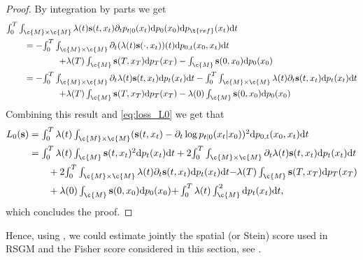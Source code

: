 \begin{proof}
	By integration by parts we get \begin{align} &\textstyle{\int_0^T \int_{\c{M}\times\c{M}} \lambda(t) \mathbf{s}(t, x_t) \partial_t p_{t|0}(x_t)\mathrm{d} p_0(x_0) \mathrm{d} p_{\t{ref}}(x_t) \mathrm{d} t} \\ & \qquad = - \textstyle{\int_0^T \int_{\c{M}\times\c{M}} \partial_t (\lambda(t) \mathbf{s}(\cdot, x_t))(t) \mathrm{d} p_{0,t}(x_0, x_t) \mathrm{d} t}\\ & \qquad \qquad \qquad \textstyle{+ \lambda(T) \int_\c{M} \mathbf{s}(T, x_T) \mathrm{d} p_T(x_T) - \int_\c{M} \mathbf{s}(0, x_0) \mathrm{d} p_0(x_0)} \\ & \qquad = - \textstyle{\int_0^T \int_{\c{M}\times\c{M}} \partial_t \lambda(t) \mathbf{s}(t, x_t) \mathrm{d} p_{t}(x_t) \mathrm{d} t} - \textstyle{\int_0^T \int_{\c{M}\times\c{M}} \lambda(t) \partial_t \mathbf{s}(t, x_t) \mathrm{d} p_{t}(x_t) \mathrm{d} t}\\ & \qquad \qquad \qquad \textstyle{+ \lambda(T) \int_\c{M} \mathbf{s}(T, x_T) \mathrm{d} p_T(x_T) - \lambda(0) \int_\c{M} \mathbf{s}(0, x_0) \mathrm{d} p_0(x_0)} \end{align} Combining this result and \eqref{eq:loss_L0} we get that \begin{align} L_0(\mathbf{s}) &= \textstyle{\int_0^T \lambda(t) \int_{\c{M} \times \c{M}} (\mathbf{s}(t, x_t) - \partial_t \log p_{t|0}(x_t|x_0))^2 \mathrm{d} p_{0,t}(x_0, x_t) \mathrm{d} t} \\ &= \textstyle{\int_0^T \lambda(t) \int_{\c{M}} \mathbf{s}(t, x_t)^2 \mathrm{d} p_t(x_t) \mathrm{d} t} + 2 \textstyle{\int_0^T \int_{\c{M}\times\c{M}} \partial_t \lambda(t) \mathbf{s}(t, x_t) \mathrm{d} p_{t}(x_t) \mathrm{d} t} \\ & \qquad +2 \textstyle{\int_0^T \int_{\c{M}\times\c{M}} \lambda(t) \partial_t \mathbf{s}(t, x_t) \mathrm{d} p_{t}(x_t) \mathrm{d} t} \textstyle{- \lambda(T) \int_\c{M} \mathbf{s}(T, x_T) \mathrm{d} p_T(x_T)} \\ & \qquad + \textstyle{\lambda(0) \int_\c{M} \mathbf{s}(0, x_0) \mathrm{d} p_0(x_0)} \textstyle{+ \int_0^T \lambda(t) \int_{\c{M}} ^2 \mathrm{d} p_t(x_t) \mathrm{d} t}, \end{align} which concludes the proof.
\end{proof}

Hence, using , we could estimate jointly the spatial (or Stein) score used in RSGM and the Fisher score considered in this section, see \textcite{choi2021density}.

